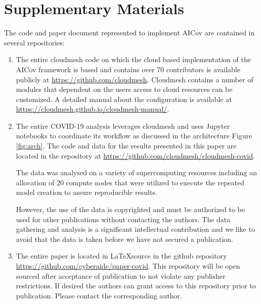 \documentclass[a4paper, inpress]{jds} %
\renewcommand{\_}{%
    \textunderscore\hspace{0pt}%
}
\begin{document}
%
%

\section*{Supplementary Materials}

The code and paper document represented to implement AICov are contained in several repositories:

\begin{enumerate}
  
\item The entire cloudmesh code on which the cloud based
  implementation of the AICov framework is based and contains over 70
  contributors is available publicly at
  \url{https://github.com/cloudmesh}. Cloudmesh contains a number of
  modules that dependent on the users access to cloud resources can be
  customized. A detailed manual about the configuration is available
  at \url{https://cloudmesh.github.io/cloudmesh-manual/}.
    
\item The entire COVID-19 analysis leverages cloudmesh and uses
  Jupyter notebooks to coordinate its workflow as discussed in the
  architecture Figure \ref{fig:arch}. The code and data for the
  results presented in this paper are located in the repository at
  \url{https://github.com/cloudmesh/cloudmesh-covid}.
    
  The data was analysed on a variety of supercomputing resources
  including an allocation of 20 compute nodes that were utilized to
  execute the repeated model creation to assure reproducible results.
    
  However, the use of the data is copyrighted and must be authorized
  to be used for other publications without contacting the
  authors. The data gathering and analysis is a significant
  intellectual contribution and we like to avoid that the data is
  taken before we have not secured a publication.
    
\item The entire paper is located in \LaTeX source in the github
  repository \url{https://github.com/cyberaide/paper-covid}. This
  repository will be open sourced after acceptance of publication to
  not violate any publisher restrictions. If desired the authors can
  grant access to this repository prior to publication. Please contact
  the corresponding author.
    
\end{enumerate}
\end{document}

